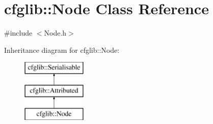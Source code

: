 \hypertarget{classcfglib_1_1Node}{}\section{cfglib\+:\+:Node Class Reference}
\label{classcfglib_1_1Node}


{\ttfamily \#include $<$Node.\+h$>$}

Inheritance diagram for cfglib\+:\+:Node\+:\begin{figure}[H]
\begin{center}
\leavevmode
\includegraphics[height=3.000000cm]{classcfglib_1_1Node}
\end{center}
\end{figure}

